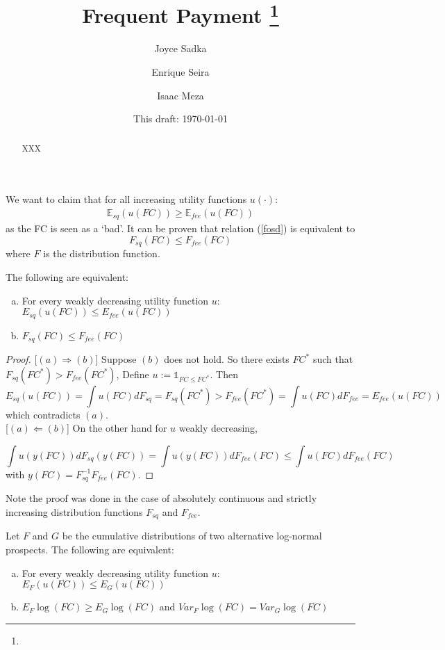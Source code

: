 \documentclass[11pt]{article}
\begin{document}
\title{Frequent Payment \thanks{}}
\author{Joyce Sadka \and Enrique Seira \and Isaac Meza }
\date{This draft:  \today \\[2 cm]}



\maketitle
\begin{abstract}
XXX 
\end{abstract}


We want to claim that for all increasing utility functions $u(\cdot)$:
\begin{align}
\label{fosd}
    \mathbb{E}_{sq}(u(FC))\geq \mathbb{E}_{fee}(u(FC))
\end{align}
as the FC is seen as a `bad'. It can be proven that relation (\ref{fosd}) is equivalent to 
\[F_{sq}(FC)\leq F_{fee}(FC)\]
where $F$ is the distribution function.

\begin{theorem}
The following are equivalent:
\begin{enumerate}[(a)]
    \item For every weakly decreasing utility function $u$: $E_{sq}(u(FC))\leq E_{fee}(u(FC))$
    \item $F_{sq}(FC)\leq F_{fee}(FC)$ 
\end{enumerate}
\end{theorem}
\begin{proof} \;

[$(a)\Longrightarrow (b)$] Suppose  $(b)$ does not hold. So there exists $FC^*$ such that $F_{sq}(FC^*)>F_{fee}(FC^*)$, Define $u:=\mathds{1}_{FC\leq FC^*}$. Then
\[E_{sq}(u(FC)) = \int u(FC)dF_{sq} = F_{sq}(FC^*)>F_{fee}(FC^*)= \int u(FC)dF_{fee} =E_{fee}(u(FC))\]
which contradicts $(a)$.\\

[$(a)\Longleftarrow (b)$] On the other hand for $u$ weakly decreasing,

\[\int u(y(FC))dF_{sq}(y(FC)) = \int u(y(FC))dF_{fee}(FC) \leq \int u(FC)dF_{fee}(FC)\]
with $y(FC) = F_{sq}^{-1}F_{fee}(FC)$.
\end{proof}

Note the proof was done in the case of absolutely continuous and strictly increasing distribution functions $F_{sq}$ and $F_{fee}$.



\begin{theorem}
Let $F$ and $G$ be the cumulative distributions of two alternative log-normal prospects. The following are equivalent:

\begin{enumerate}[(a)]
    \item For every weakly decreasing utility function $u$: $E_{F}(u(FC))\leq E_G(u(FC))$
    \item $E_F \log(FC)\geq E_G\log(FC)$ and $Var_F \log(FC)= Var_G\log(FC)$
\end{enumerate}

\end{theorem}
\end{document}
